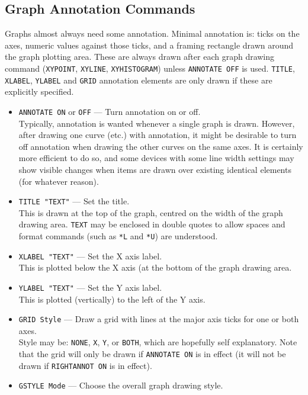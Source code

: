 \documentclass[a4paper,twoside,11pt]{article}
\newcommand{\textttc}[1]{\texttt{\textcolor{OurRed}{#1}}}
\begin{document}
\subsection{Graph Annotation Commands}
Graphs almost always need some annotation. Minimal annotation is: ticks on the axes, numeric values
against those ticks, and a framing rectangle drawn around the graph plotting area. These are always
drawn after each graph drawing command (\texttt{XYPOINT}, \texttt{XYLINE}, \texttt{XYHISTOGRAM}) 
unless \texttt{ANNOTATE OFF} is used.
\texttt{TITLE}, \texttt{XLABEL}, \texttt{YLABEL} and \texttt{GRID} annotation elements are only 
drawn if these are explicitly specified.
\begin{itemize}
\item \textttc{ANNOTATE ON} or \texttt{OFF} --- Turn annotation on or off.\\
   Typically, annotation is wanted whenever a single graph is drawn. However, after drawing one curve
   (etc.) with annotation, it might be desirable to turn off annotation when drawing the other curves
   on the same axes. It is certainly more efficient to do so, and some devices with some line width settings
   may show visible changes when items are drawn over existing identical elements (for whatever reason).
\item \textttc{TITLE "TEXT"} --- Set the title.\\
   This is drawn at the top of the graph, centred on the width of the graph drawing area.
   \texttt{TEXT} may be enclosed in double quotes to allow spaces and format commands 
   (such as \texttt{*L} and \texttt{*U}) are
   understood.
\item \textttc{XLABEL "TEXT"} --- Set the X axis label.\\
   This is plotted below the X axis (at the bottom of the graph drawing area.
\item \textttc{YLABEL "TEXT"} --- Set the Y axis label.\\
   This is plotted (vertically) to the left of the Y axis.
\item \textttc{GRID Style} --- Draw a grid with lines at the major axis ticks for one or both axes.\\
   Style may be: \texttt{NONE}, \texttt{X}, \texttt{Y}, or \texttt{BOTH}, which are hopefully self explanatory.
   Note that the grid will only be drawn if \textttc{ANNOTATE ON} is in effect (it will not be  drawn if
   \textttc{RIGHTANNOT ON} is in effect).
\item \textttc{GSTYLE Mode} --- Choose the overall graph drawing style.  \\

\end{itemize}
\end{document}
